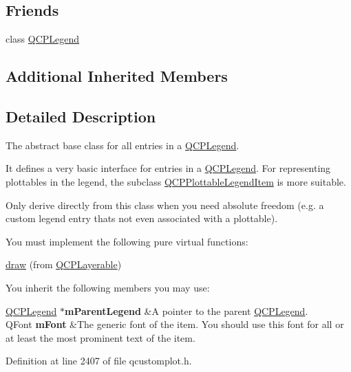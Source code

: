 \subsection*{Friends}
\begin{DoxyCompactItemize}
\item 
class \hyperlink{class_q_c_p_abstract_legend_item_a8429035e7adfbd7f05805a6530ad5e3b}{Q\+C\+P\+Legend}
\end{DoxyCompactItemize}
\subsection*{Additional Inherited Members}


\subsection{Detailed Description}
The abstract base class for all entries in a \hyperlink{class_q_c_p_legend}{Q\+C\+P\+Legend}. 

It defines a very basic interface for entries in a \hyperlink{class_q_c_p_legend}{Q\+C\+P\+Legend}. For representing plottables in the legend, the subclass \hyperlink{class_q_c_p_plottable_legend_item}{Q\+C\+P\+Plottable\+Legend\+Item} is more suitable.

Only derive directly from this class when you need absolute freedom (e.\+g. a custom legend entry that\textquotesingle{}s not even associated with a plottable).

You must implement the following pure virtual functions\+: \begin{DoxyItemize}
\item \hyperlink{class_q_c_p_abstract_legend_item_a97dedc084c672359710f16b31d046d1d}{draw} (from \hyperlink{class_q_c_p_layerable}{Q\+C\+P\+Layerable})\end{DoxyItemize}
You inherit the following members you may use\+: \begin{TabularC}{2}
\hline
\hyperlink{class_q_c_p_legend}{Q\+C\+P\+Legend} $\ast${\bfseries m\+Parent\+Legend}  &A pointer to the parent \hyperlink{class_q_c_p_legend}{Q\+C\+P\+Legend}. \\
Q\+Font {\bfseries m\+Font}  &The generic font of the item. You should use this font for all or at least the most prominent text of the item.  \\
\end{TabularC}


Definition at line 2407 of file qcustomplot.\+h.



